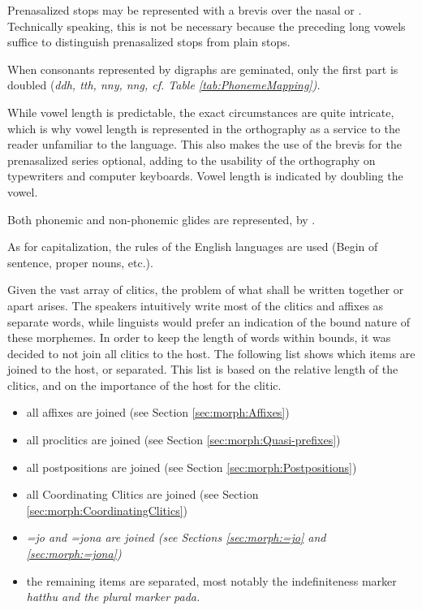 Prenasalized stops may be represented with a brevis over the nasal  or .  Technically speaking, this is not be necessary because the preceding long vowels suffice to distinguish prenasalized stops from plain stops.

When consonants represented by digraphs are geminated, only the first part is doubled (\em ddh, tth, nny, nng\em, cf. Table \ref{tab:PhonemeMapping}).
 
While vowel length is predictable, the exact circumstances are quite intricate, which is why vowel length is represented in the orthography as a service to the reader unfamiliar to the language. This also makes the use of the brevis for the prenasalized series optional, adding to the usability of the orthography on typewriters and computer keyboards. Vowel length is indicated by doubling the vowel.

Both phonemic and non-phonemic glides are represented,  by .
 
As for capitalization, the rules of the English languages are used (Begin of sentence, proper nouns, etc.).

Given the vast array of clitics, the problem of what shall be written together or apart arises. The speakers intuitively write most of the clitics and affixes as separate words, while linguists would prefer an indication of the bound nature of these morphemes. In order to keep the length of words within bounds, it was decided to not join all clitics to the host. The following list shows which items are joined to the host, or separated. This list is based on the relative length of the clitics, and on the importance of the host for the clitic.

\begin{itemize}
 \item all affixes are joined (see Section \ref{sec:morph:Affixes})
 \item all proclitics are joined (see Section \ref{sec:morph:Quasi-prefixes})
 \item all postpositions are joined (see Section \ref{sec:morph:Postpositions})
 \item all Coordinating Clitics are joined (see Section \ref{sec:morph:CoordinatingClitics})
 \item \em =jo \em and \em =jona \em are joined (see Sections \ref{sec:morph:=jo} and \ref{sec:morph:=jona})
 \item the remaining items are separated, most notably the indefiniteness marker \em hatthu \em and the plural marker \em pada\em.
\end{itemize}
 

